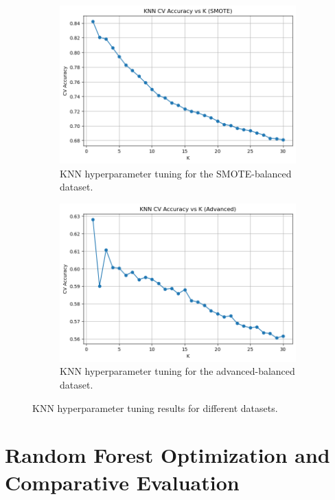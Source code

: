 \begin{figure}[!h]
\begin{subfigure}[t]{0.45\textwidth}
        \includegraphics[width=\textwidth]{../results/knn_vs_k_smote.png}
        \caption{KNN hyperparameter tuning for the SMOTE-balanced dataset.}
        \label{fig:knn_k_tuning_smote}
    \end{subfigure}
    \hfill
    \begin{subfigure}[t]{0.45\textwidth}
        \centering
        \includegraphics[width=\textwidth]{../results/knn_vs_k_advanced.png}
        \caption{KNN hyperparameter tuning for the advanced-balanced dataset.}
        \label{fig:knn_k_tuning_advanced}
    \end{subfigure}
    \caption{KNN hyperparameter tuning results for different datasets.}
    \label{fig:knn_hyperparameter_tuning}
\end{figure}


\section{Random Forest Optimization and Comparative Evaluation}

